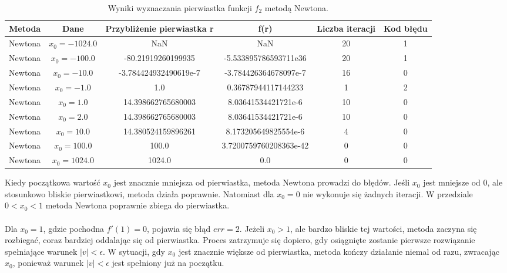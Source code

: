 \documentclass{article}
\begin{document}
\begin{enumerate}[label=(\alph*)]
\begin{table}[H]
    \centering
    \begin{tabular}{|c|c||c|c|c|c|}
        \hline
        Metoda & Dane & Przybliżenie pierwiastka r & f(r) & Liczba iteracji & Kod błędu\\
        \hline
        \hline
        Newtona & $x_0 = -1024.0 $ &NaN & NaN & 20 & 1 \\
        \hline
        Newtona &$x_0 = - 100.0$ & -80.21919260199935 & -5.533895786593711e36 & 20 & 1 \\
        \hline
        Newtona & $x_0 = - 10.0$ & -3.784424932490619e-7 & -3.784426364678097e-7 & 16 & 0\\
        \hline
        Newtona & $x_0 = -1.0$ & 1.0 & 0.36787944117144233 & 1 & 2\\
        \hline
        Newtona & $x_0 = 1.0 $ & 14.398662765680003 & 8.03641534421721e-6 & 10 & 0 \\
        \hline
        Newtona &$x_0 =2.0$ &14.398662765680003 & 8.03641534421721e-6 & 10 & 0\\
        \hline
        Newtona & $x_0 = 10.0$ & 14.380524159896261 & 8.173205649825554e-6 & 4 & 0 \\
        \hline
        Newtona &$x_0 =  100.0$ & 100.0 & 3.7200759760208363e-42 & 0 & 0\\
        \hline
        Newtona & $x_0 = 1024.0$ & 1024.0 & 0.0 & 0 & 0 \\
        \hline
            \end{tabular}
    \caption{Wyniki wyznaczania pierwiastka funkcji $f_2$ metodą Newtona.}
\end{table}
Kiedy początkowa wartość \(x_0\) jest znacznie mniejsza od pierwiastka, metoda Newtona prowadzi do błędów. Jeśli \(x_0\) jest mniejsze od 0, ale stosunkowo bliskie pierwiastkowi, metoda działa poprawnie. Natomiast dla \(x_0 = 0\) nie wykonuje się żadnych iteracji. W przedziale \(0 < x_0 < 1\) metoda Newtona poprawnie zbiega do pierwiastka. 
\\ \\
Dla \(x_0 = 1\), gdzie pochodna \(f'(1) = 0\), pojawia się błąd \(err = 2\). Jeżeli \(x_0 > 1\), ale bardzo bliskie tej wartości, metoda zaczyna się rozbiegać, coraz bardziej oddalając się od pierwiastka. Proces zatrzymuje się dopiero, gdy osiągnięte zostanie pierwsze rozwiązanie spełniające warunek \(|v| < \epsilon\). W sytuacji, gdy \(x_0\) jest znacznie większe od pierwiastka, metoda kończy działanie niemal od razu, zwracając \(x_0\), ponieważ warunek \(|v| < \epsilon\) jest spełniony już na początku.

\end{enumerate}
\end{document}
